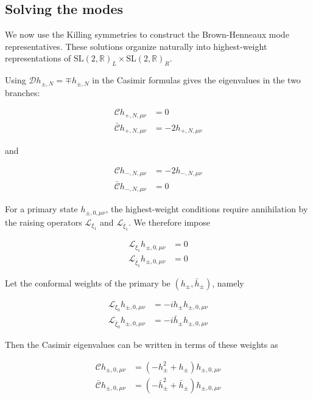 \subsection{Solving the modes}\label{solving-the-modes}

We now use the Killing symmetries to construct the Brown-Henneaux mode representatives. These solutions organize naturally into highest-weight representations of \(\mathrm{SL}(2,\mathbb{R})_{L}\times \mathrm{SL}(2,\mathbb{R})_{R}\).

Using \(\mathcal{D}h_{\pm,N}=\mp h_{\pm,N}\) in the Casimir formulas gives the eigenvalues in the two branches:

\begin{align}
\mathcal{C}h_{+,N,\mu \nu} & =0 \\
\mathcal{\bar{C}}h_{+,N,\mu \nu} & =-2h_{+,N,\mu \nu}
\end{align}

and

\begin{align}
\mathcal{C}h_{-,N,\mu \nu} & =-2h_{-,N,\mu \nu} \\
\mathcal{\bar{C}}h_{-,N,\mu \nu} & =0
\end{align}

For a primary state \(h_{\pm,0,\mu \nu}\), the highest-weight conditions require annihilation by the raising operators \(\mathcal{L}_{\xi_{1}}\) and \(\mathcal{L}_{\bar{\xi}_{1}}\). We therefore impose

\begin{align}
\mathcal{L}_{\xi_{1}}h_{\pm,0,\mu \nu} & =0 \\
\mathcal{L}_{\bar{\xi}_{1}}h_{\pm,0,\mu \nu} & =0
\end{align}

Let the conformal weights of the primary be \((h_{\pm},\bar{h}_{\pm})\), namely

\begin{align}
\mathcal{L}_{\xi_{0}}h_{\pm,0,\mu \nu} & =-ih_{\pm}h_{\pm,0,\mu \nu} \\
\mathcal{L}_{\bar{\xi}_{0}}h_{\pm,0,\mu \nu} & =-i \bar{h}_{\pm}h_{\pm,0,\mu \nu}
\end{align}

Then the Casimir eigenvalues can be written in terms of these weights as

\begin{align}
\mathcal{C}h_{\pm,0,\mu \nu} & =(-h^{2}_{\pm}+h_{\pm})h_{\pm,0,\mu \nu} \\
\mathcal{\bar{C}}h_{\pm,0,\mu \nu} & =(-\bar{h}_{\pm}^{2}+\bar{h}_{\pm})h_{\pm,0,\mu \nu}
\end{align}

